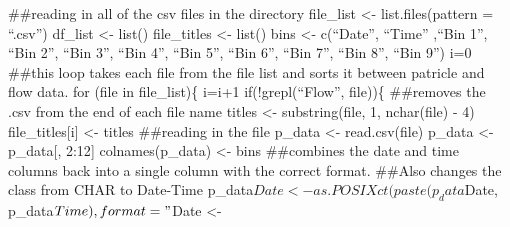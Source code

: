 \documentclass[
]{article}
\begin{document}
\#\#reading in all of the csv files in the directory file\_list
\textless- list.files(pattern = ``.csv'') df\_list \textless- list()
file\_titles \textless- list() bins \textless- c(``Date'', ``Time''
,``Bin 1'', ``Bin 2'', ``Bin 3'', ``Bin 4'', ``Bin 5'', ``Bin 6'', ``Bin
7'', ``Bin 8'', ``Bin 9'') i=0 \#\#this loop takes each file from the
file list and sorts it between patricle and flow data. for (file in
file\_list)\{ i=i+1 if(!grepl(``Flow'', file))\{ \#\#removes the .csv
from the end of each file name titles \textless- substring(file, 1,
nchar(file) - 4) file\_titles{[}i{]} \textless- titles \#\#reading in
the file p\_data \textless- read.csv(file) p\_data \textless-
p\_data{[}, 2:12{]} colnames(p\_data) \textless- bins \#\#combines the
date and time columns back into a single column with the correct format.
\#\#Also changes the class from CHAR to Date-Time
p\_data\(Date <- as.POSIXct(paste(p_data\)Date,
p\_data\(Time), format="%
\)Date \textless-
\end{document}
